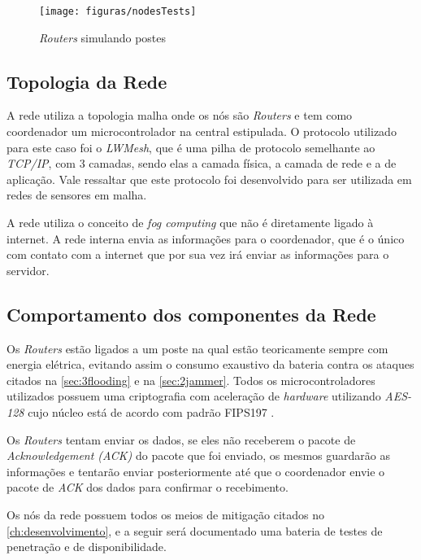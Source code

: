 \begin{figure}[ht]
    \centering
    \caption{\emph{Routers} simulando postes}    
    \texttt{[image: figuras/nodesTests]}
    \label{fig:4board}
\end{figure}

\subsection{Topologia da Rede}
\par A rede utiliza a topologia malha onde os n\'os s\~ao \emph{Routers} e tem como coordenador um microcontrolador na central estipulada. O protocolo utilizado para este caso foi o \emph{LWMesh}, que \'e uma pilha de protocolo semelhante ao \emph{TCP/IP}, com 3 camadas, sendo elas a camada f\'isica, a camada de rede e a de aplica\c{c}\~ao. Vale ressaltar que este protocolo foi desenvolvido para ser utilizada em redes de sensores em malha.
\par A rede utiliza o conceito de \emph{fog computing} que não é diretamente ligado à internet. A rede interna envia as informações para o coordenador, que é o único com contato com a internet que por sua vez irá enviar as informações para o servidor.

\subsection{Comportamento dos componentes da Rede}
\par Os \emph{Routers} est\~ao ligados a um poste na qual est\~ao teoricamente sempre com energia el\'etrica, evitando assim o consumo exaustivo da bateria contra os ataques citados na \autoref{sec:3flooding} e na \autoref{sec:2jammer}. Todos os microcontroladores utilizados possuem uma criptografia com acelera\c{c}\~ao de \emph{hardware} utilizando \emph{AES-128} cujo n\'ucleo est\'a de acordo com padr\~ao FIPS197 \cite{fips197}.
\par Os \emph{Routers} tentam enviar os dados, se eles n\~ao receberem o pacote de \emph{Acknowledgement (ACK)} do pacote que foi enviado, os mesmos guardar\~ao as informa\c{c}\~oes e tentar\~ao enviar posteriormente at\'e que o coordenador envie o pacote de \emph{ACK} dos dados para confirmar o recebimento.

\par Os n\'os da rede possuem todos os meios de mitiga\c{c}\~ao citados no \autoref{ch:desenvolvimento}, e a seguir ser\'a documentado uma bateria de testes de penetra\c{c}\~ao e de disponibilidade.

